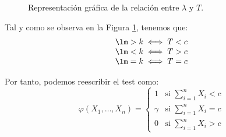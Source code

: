 \begin{ejercicio}
\begin{description}
\begin{figure}[h]
            \caption{Representación gráfica de la relación entre $\lambda$ y $T$.}
            \label{fig:lambda_T_relation_ej7.4.2}
        \end{figure}

        Tal y como se observa en la Figura \ref{fig:lambda_T_relation_ej7.4.2}, tenemos que:
        \begin{equation*}
            \begin{array}{l}
                \lm > k \iff T < c \\
                \lm < k \iff T > c \\
                \lm = k \iff T = c
            \end{array}
        \end{equation*}

        Por tanto, podemos reescribir el test como:
        \begin{equation*}
            \varphi(X_1, \ldots, X_n) = \left\{\begin{array}{ll}
                1 & \text{si\ } \sum\limits_{i=1}^{n}X_i<c \\
                 \gamma& \text{si\ } \sum\limits_{i=1}^{n}X_i = c \\
                    0 & \text{si\ } \sum\limits_{i=1}^{n}X_i > c
            \end{array}\right. 
        \end{equation*}


\end{description}
\end{ejercicio}
